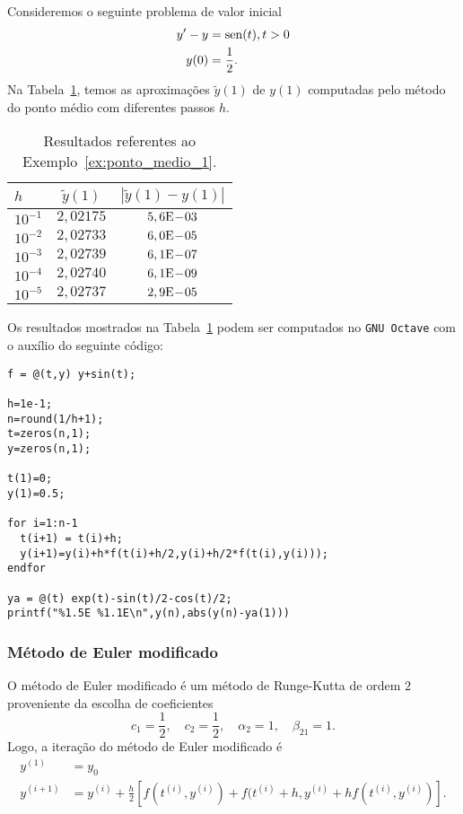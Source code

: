 \begin{ex}\label{ex:ponto_medio_1}
  Consideremos o seguinte problema de valor inicial
  \begin{align}
    y' - y &= \operatorname{sen}(t), t>0\\
    y(0) &= \frac{1}{2}.
  \end{align}
  Na Tabela~\ref{tab:ex_ponto_medio_1}, temos as aproximações $\tilde{y}(1)$ de $y(1)$ computadas pelo método do ponto médio com diferentes passos $h$.
 
  \begin{table}[h!]
    \centering
    \begin{tabular}{l|cc}
      $h$ & $\tilde{y}(1)$ & $|\tilde{y}(1)-y(1)|$\\\hline
      $10^{-1}$ & $2,02175$ & $5,6\mathrm{E}\!-\!03$ \\
      $10^{-2}$ & $2,02733$ & $6,0\mathrm{E}\!-\!05$ \\
      $10^{-3}$ & $2,02739$ & $6,1\mathrm{E}\!-\!07$ \\
      $10^{-4}$ & $2,02740$ & $6,1\mathrm{E}\!-\!09$ \\
      $10^{-5}$ & $2,02737$ & $2,9\mathrm{E}\!-\!05$ \\\hline
    \end{tabular}
    \caption{Resultados referentes ao Exemplo~\ref{ex:ponto_medio_1}.}
    \label{tab:ex_ponto_medio_1}
  \end{table}

\ifisoctave
Os resultados mostrados na Tabela~\ref{tab:ex_ponto_medio_1} podem ser computados no \verb+GNU Octave+ com o auxílio do seguinte código:
\begin{verbatim}
f = @(t,y) y+sin(t);

h=1e-1;
n=round(1/h+1);
t=zeros(n,1);
y=zeros(n,1);

t(1)=0;
y(1)=0.5;

for i=1:n-1
  t(i+1) = t(i)+h;
  y(i+1)=y(i)+h*f(t(i)+h/2,y(i)+h/2*f(t(i),y(i)));
endfor

ya = @(t) exp(t)-sin(t)/2-cos(t)/2;
printf("%1.5E %1.1E\n",y(n),abs(y(n)-ya(1)))
\end{verbatim}
\fi
\end{ex}

\subsubsection{Método de Euler modificado}

O método de Euler modificado é um método de Runge-Kutta de ordem $2$ proveniente da escolha de coeficientes
\begin{equation}
  c_1 = \frac{1}{2}, \quad c_2 = \frac{1}{2}, \quad \alpha_2 = 1,\quad \beta_{21}=1.
\end{equation}
Logo, a iteração do método de Euler modificado é
\begin{align}
  y^{(1)} &= y_0\\
  y^{(i+1)} &= y^{(i)} + \frac{h}{2}\left[f(t^{(i)},y^{(i)}) + f(t^{(i)}+h,y^{(i)}+hf(t^{(i)},y^{(i)})\right].
\end{align}

